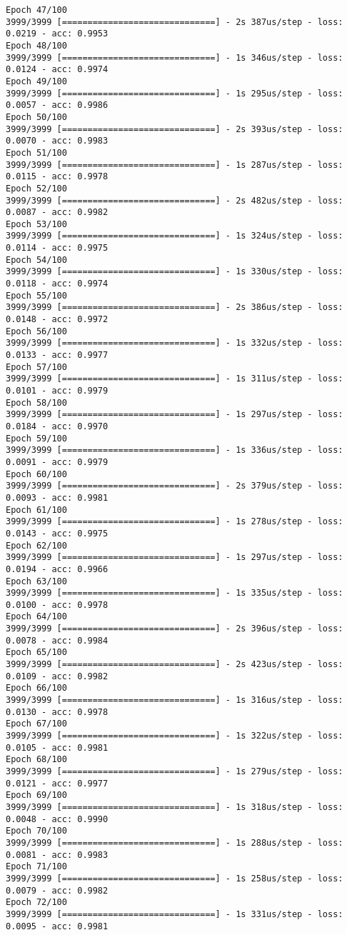 \documentclass[11pt]{article}
\begin{document}
\begin{Verbatim}[commandchars=\\\{\}]
Epoch 47/100
3999/3999 [==============================] - 2s 387us/step - loss: 0.0219 - acc: 0.9953
Epoch 48/100
3999/3999 [==============================] - 1s 346us/step - loss: 0.0124 - acc: 0.9974
Epoch 49/100
3999/3999 [==============================] - 1s 295us/step - loss: 0.0057 - acc: 0.9986
Epoch 50/100
3999/3999 [==============================] - 2s 393us/step - loss: 0.0070 - acc: 0.9983
Epoch 51/100
3999/3999 [==============================] - 1s 287us/step - loss: 0.0115 - acc: 0.9978
Epoch 52/100
3999/3999 [==============================] - 2s 482us/step - loss: 0.0087 - acc: 0.9982
Epoch 53/100
3999/3999 [==============================] - 1s 324us/step - loss: 0.0114 - acc: 0.9975
Epoch 54/100
3999/3999 [==============================] - 1s 330us/step - loss: 0.0118 - acc: 0.9974
Epoch 55/100
3999/3999 [==============================] - 2s 386us/step - loss: 0.0148 - acc: 0.9972
Epoch 56/100
3999/3999 [==============================] - 1s 332us/step - loss: 0.0133 - acc: 0.9977
Epoch 57/100
3999/3999 [==============================] - 1s 311us/step - loss: 0.0101 - acc: 0.9979
Epoch 58/100
3999/3999 [==============================] - 1s 297us/step - loss: 0.0184 - acc: 0.9970
Epoch 59/100
3999/3999 [==============================] - 1s 336us/step - loss: 0.0091 - acc: 0.9979
Epoch 60/100
3999/3999 [==============================] - 2s 379us/step - loss: 0.0093 - acc: 0.9981
Epoch 61/100
3999/3999 [==============================] - 1s 278us/step - loss: 0.0143 - acc: 0.9975
Epoch 62/100
3999/3999 [==============================] - 1s 297us/step - loss: 0.0194 - acc: 0.9966
Epoch 63/100
3999/3999 [==============================] - 1s 335us/step - loss: 0.0100 - acc: 0.9978
Epoch 64/100
3999/3999 [==============================] - 2s 396us/step - loss: 0.0078 - acc: 0.9984
Epoch 65/100
3999/3999 [==============================] - 2s 423us/step - loss: 0.0109 - acc: 0.9982
Epoch 66/100
3999/3999 [==============================] - 1s 316us/step - loss: 0.0130 - acc: 0.9978
Epoch 67/100
3999/3999 [==============================] - 1s 322us/step - loss: 0.0105 - acc: 0.9981
Epoch 68/100
3999/3999 [==============================] - 1s 279us/step - loss: 0.0121 - acc: 0.9977
Epoch 69/100
3999/3999 [==============================] - 1s 318us/step - loss: 0.0048 - acc: 0.9990
Epoch 70/100
3999/3999 [==============================] - 1s 288us/step - loss: 0.0081 - acc: 0.9983
Epoch 71/100
3999/3999 [==============================] - 1s 258us/step - loss: 0.0079 - acc: 0.9982
Epoch 72/100
3999/3999 [==============================] - 1s 331us/step - loss: 0.0095 - acc: 0.9981

\end{Verbatim}
\end{document}

